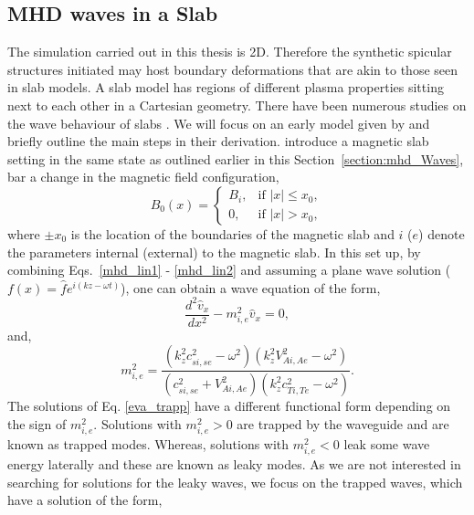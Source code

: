 \documentclass[12pt]{ociamthesis}
\newcommand{\eref}[1]{Eq. \eqref{#1}}
\begin{document}
\subsection{MHD waves in a Slab}
\label{section:Tan_I}
The simulation carried out in this thesis is 2D. Therefore the synthetic spicular structures initiated may host boundary deformations that are akin to those seen in slab models. A slab model has regions of different plasma properties sitting next to each other in a Cartesian geometry. There have been numerous studies on the wave behaviour of slabs \citep{Roberts1981SoPh6939R, Edwin1982SoPh76239E, Roberts1990IAUS142159R, Goossens1992SoPh138233G, Goossens2009AA503213G, Murawski2015AA577A126M, Allcock2017SoPh29235A}. We will focus on an early model given by \cite{Roberts1981SoPh6939R} and briefly outline the main steps in their derivation. \cite{Roberts1981SoPh6939R} introduce a magnetic slab setting in the same state as outlined earlier in this Section~\ref{section:mhd_Waves}, bar a change in the magnetic field configuration,
\begin{equation}
    B_0(x) = 
    \begin{cases}
      B_i, & \text{if } |x| \leq x_0, \\
      0, & \text{if } |x| > x_0,
    \end{cases}
\end{equation}
where $\pm x_0$ is the location of the boundaries of the magnetic slab and $i$ ($e$) denote the parameters internal (external) to the magnetic slab. In this set up, by combining Eqs.~\eqref{mhd_lin1} - \eqref{mhd_lin2} and assuming a plane wave solution ($f(x)=\hat{f} e^{i(kz-\omega t)}$), one can obtain a wave equation of the form,
\begin{equation}\label{eva_trapp}
    \frac{d^2 \hat{v}_x}{dx^2}-m^2_{i,e} \hat{v}_x = 0,
\end{equation}
and,
\begin{equation}
    m_{i,e}^2 = \frac{(k_z^2 c_{si,se}^2-\omega^2)(k_z^2 V_{Ai,Ae}^2-\omega^2)}{(c_{si,se}^2+V_{Ai,Ae}^2)(k_z^2 c_{Ti,Te}^2-\omega^2)}.
\end{equation}
The solutions of \eref{eva_trapp} have a different functional form depending on the sign of $m^2_{i,e}$. Solutions with $m^2_{i,e}>0$ are trapped by the waveguide and are known as trapped modes. Whereas, solutions with $m^2_{i,e}<0$ leak some wave energy laterally and these are known as leaky modes. As we are not interested in searching for solutions for the leaky waves, we focus on the trapped waves, which have a solution of the form,
\end{document}
